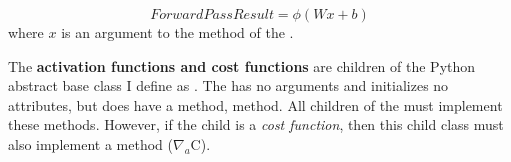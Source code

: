 \documentclass{article}
\begin{document}
\begin{equation}
	ForwardPassResult = \phi(Wx + b)
\end{equation}
where $x$ is an argument to the  method of the
.

The \textbf{activation functions and cost functions} are children of the Python
abstract base class I define as . The
 has no arguments and initializes no attributes, but
does have a  method,  method. All
children of the  must implement these methods. However, if
the child is a \textit{cost function}, then this child class must also
implement a  method ($\nabla_{a}\text{C}$).

\pagebreak
\printbibliography
\end{document}
